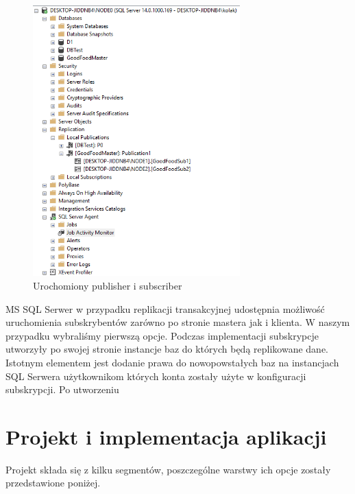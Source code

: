 \documentclass{article}
\begin{document}
	\begin{figure}[hbt!]
		\includegraphics[width=8cm]{Files/Pictures/postawionaReplikacja}
		\centering
		\caption{Urochomiony publisher i subscriber}
	\end{figure}
	
	MS SQL Serwer w przypadku replikacji transakcyjnej udostępnia możliwość uruchomienia subskrybentów zarówno po stronie mastera jak i klienta. W naszym przypadku wybraliśmy pierwszą opcje. Podczas implementacji subskrypcje utworzyły po swojej stronie instancje baz do których będą replikowane dane. Istotnym elementem jest dodanie prawa do nowopowstałych baz na instancjach SQL Serwera użytkownikom których konta zostały użyte w konfiguracji subskrypcji. Po utworzeniu 
	
	
	\newpage	

\section{Projekt i implementacja aplikacji}
Projekt składa się z kilku segmentów, poszczególne warstwy ich opcje zostały przedstawione poniżej.
\end{document}
